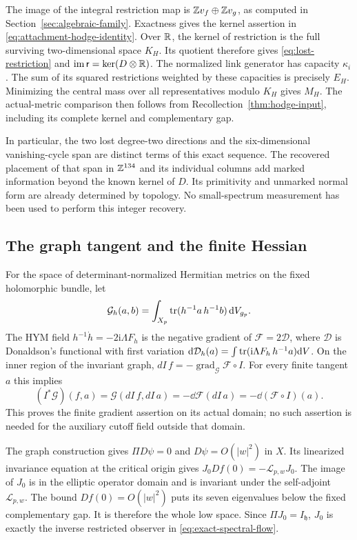 The image of the integral restriction map is
$\mathbb Z v_f\oplus\mathbb Z v_g$, as computed in
Section~\ref{sec:algebraic-family}. Exactness gives
the kernel assertion in \eqref{eq:attachment-hodge-identity}.
Over $\mathbb R$, the kernel of restriction is the full surviving
two-dimensional space $K_H$. Its quotient therefore gives
\eqref{eq:lost-restriction} and $\operatorname{im}\mathsf r=\ker(D\otimes\mathbb R)$.
The normalized link generator has capacity $\kappa_i$.
The sum of its squared restrictions weighted by these
capacities is precisely $E_H$. Minimizing the central mass
over all representatives modulo $K_H$ gives $M_H$.
The actual-metric comparison then follows from
Recollection~\ref{thm:hodge-input}, including its complete
kernel and complementary gap.

In particular, the two lost degree-two directions and the
six-dimensional vanishing-cycle span are distinct terms
of this exact sequence. The recovered placement of that
span in $\mathbb Z^{134}$ and its individual columns add marked
information beyond the known kernel of $D$. Its primitivity
and unmarked normal form are already determined by topology.
No small-spectrum measurement has been used to perform
this integer recovery.

\subsection{The graph tangent and the finite Hessian}

For the space of determinant-normalized Hermitian metrics
on the fixed holomorphic bundle, let
\[
 \mathcal G_h(a,b)=\int_{X_p}
       \operatorname{tr}(h^{-1}a\,h^{-1}b)\,\mathrm d V_{g_p}.
\]
The HYM field $h^{-1}\dot h=-2\mathrm i\Lambda F_h$ is
the negative gradient of $\mathcal F=2\mathcal D$, where
$\mathcal D$ is Donaldson's functional with first variation
$\mathrm d\mathcal D_h(a)=\int\operatorname{tr}(\mathrm i\Lambda F_h\,h^{-1}a)\mathrm d V$.
On the inner region of the invariant graph,
$dI\,f=-\operatorname{grad}_{\mathcal G}\mathcal F\circ I$.
For every finite tangent $a$ this implies
\[
 (I^*\mathcal G)(f,a)
   =\mathcal G(dI\,f,dI\,a)
   =-\dd\mathcal F(dI\,a)
   =-\dd(\mathcal F\circ I)(a).
\]
This proves the finite gradient assertion on its actual
domain; no such assertion is needed for the auxiliary
cutoff field outside that domain.

The graph construction gives $\Pi D\psi=0$ and
$D\psi=O(|w|^2)$ in $X$. Its linearized invariance equation
at the critical origin gives
$J_0Df(0)=-\mathcal L_{p,w}J_0$.
The image of $J_0$ is in the elliptic operator domain and
is invariant under the self-adjoint $\mathcal L_{p,w}$.
The bound $Df(0)=O(|w|^2)$ puts its seven eigenvalues
below the fixed complementary gap. It is therefore
the whole low space. Since $\Pi J_0=I_{\mathfrak h}$,
$J_0$ is exactly the inverse restricted observer in
\eqref{eq:exact-spectral-flow}.

